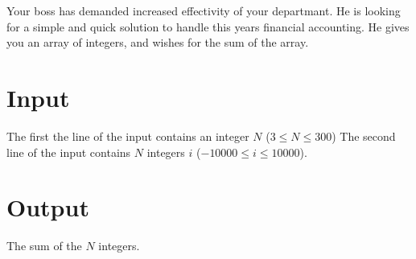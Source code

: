 

Your boss has demanded increased effectivity of your departmant.
He is looking for a simple and quick solution to handle this years financial accounting.
He gives you an array of integers, and wishes for the sum of the array.

\section*{Input}

The first the line of the input contains an integer $N$ ($3 \leq N \leq 300$)
The second line of the input contains $N$ integers $i$ ($-10000 \leq i \leq 10000$).

\section*{Output}

The sum of the $N$ integers.